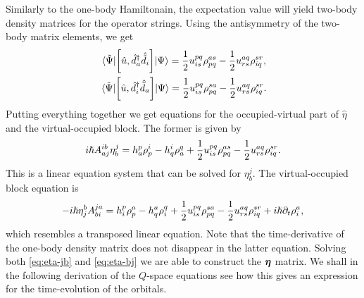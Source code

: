             Similarly to the one-body Hamiltonain, the expectation value will
            yield two-body density matrices for the operator strings.
            Using the antisymmetry of the two-body matrix elements, we get
            \begin{gather}
                \mel*{\tilde{\Psi}}{
                    \left[
                        \hat{u}
                    , 
                        \hat{d}^{\dagger}_{a}
                        \hat{\tilde{d}}_{i}
                    \right]
                }{\Psi}
                =
                \frac{1}{2}u^{pq}_{is}\rho^{as}_{pq}
                - \frac{1}{2}u^{aq}_{rs}\rho^{sr}_{iq},
                \\
                \mel*{\tilde{\Psi}}{
                    \left[
                        \hat{u}
                    , 
                        \hat{d}^{\dagger}_{i}
                        \hat{\tilde{d}}_{a}
                    \right]
                }{\Psi}
                =
                \frac{1}{2}
                u^{pq}_{is}\rho^{sa}_{pq}
                -
                \frac{1}{2}
                u^{aq}_{rs}\rho^{sr}_{iq}.
            \end{gather}
            Putting everything together we get equations for the
            occupied-virtual part of $\hat{\eta}$ and the virtual-occupied
            block.
            The former is given by
            \begin{align}
                i\hslash A^{ib}_{aj}\eta^{j}_{b}
                = h^{p}_{a}\rho^{i}_{p}
                - h^{i}_{q}\rho^{q}_{a}
                + \frac{1}{2}u^{pq}_{is}\rho^{as}_{pq}
                - \frac{1}{2}u^{aq}_{rs}\rho^{sr}_{iq}.
                \label{eq:eta-jb}
            \end{align}
            This is a linear equation system that can be solved for
            $\eta^{j}_{b}$.
            The virtual-occupied block equation is
            \begin{align}
                -i\hslash\eta^{b}_{j}
                A^{ja}_{bi}
                =
                h^{p}_{i}\rho^{a}_{p}
                -
                h^{a}_{q}\rho^{q}_{i}
                +
                \frac{1}{2}
                u^{pq}_{is}\rho^{sa}_{pq}
                -
                \frac{1}{2}
                u^{aq}_{rs}\rho^{sr}_{iq}
                + i\hslash\partial_t\rho^{a}_{i},
                \label{eq:eta-bj}
            \end{align}
            which resembles a transposed linear equation.
            Note that the time-derivative of the one-body density matrix does
            not disappear in the latter equation.
            Solving both \autoref{eq:eta-jb} and \autoref{eq:eta-bj} we are able
            to construct the $\boldsymbol{\eta}$ matrix.
            We shall in the following derivation of the $Q$-space equations see
            how this gives an expression for the time-evolution of the orbitals.

